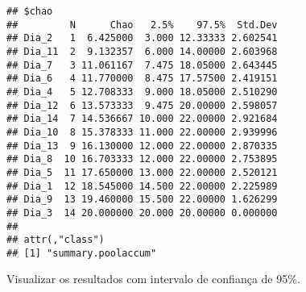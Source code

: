\documentclass[
]{book}
\begin{document}
\begin{verbatim}
## $chao
##         N      Chao   2.5%    97.5%  Std.Dev
## Dia_2   1  6.425000  3.000 12.33333 2.602541
## Dia_11  2  9.132357  6.000 14.00000 2.603968
## Dia_7   3 11.061167  7.475 18.05000 2.643445
## Dia_6   4 11.770000  8.475 17.57500 2.419151
## Dia_4   5 12.708333  9.000 18.05000 2.510290
## Dia_12  6 13.573333  9.475 20.00000 2.598057
## Dia_14  7 14.536667 10.000 22.00000 2.921684
## Dia_10  8 15.378333 11.000 22.00000 2.939996
## Dia_13  9 16.130000 12.000 22.00000 2.870335
## Dia_8  10 16.703333 12.000 22.00000 2.753895
## Dia_5  11 17.650000 13.000 22.00000 2.520121
## Dia_1  12 18.545000 14.500 22.00000 2.225989
## Dia_9  13 19.460000 15.500 22.00000 1.626299
## Dia_3  14 20.000000 20.000 20.00000 0.000000
## 
## attr(,"class")
## [1] "summary.poolaccum"
\end{verbatim}

Visualizar os resultados com intervalo de confiança de 95\%.
\end{document}
